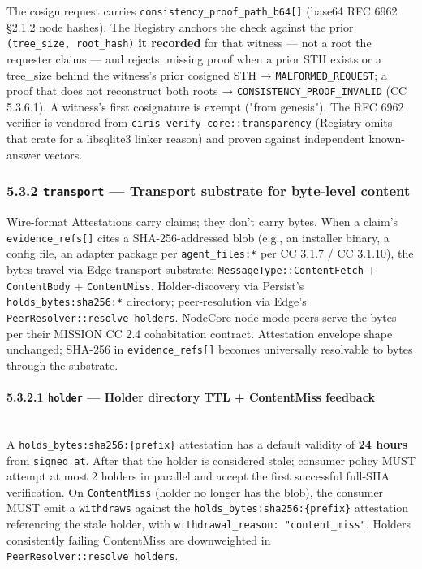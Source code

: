 \documentclass[11pt]{article}
\begin{document}
The cosign request carries \texttt{consistency\_proof\_path\_b64[]} (base64 RFC 6962 §2.1.2 node hashes). The Registry anchors the check against the prior \texttt{(tree\_size, root\_hash)} \textbf{it recorded} for that witness — not a root the requester claims — and rejects: missing proof when a prior STH exists or a tree\_size behind the witness's prior cosigned STH → \texttt{MALFORMED\_REQUEST}; a proof that does not reconstruct both roots → \texttt{CONSISTENCY\_PROOF\_INVALID} (CC 5.3.6.1). A witness's first cosignature is exempt ("from genesis"). The RFC 6962 verifier is vendored from \texttt{ciris-verify-core::transparency} (Registry omits that crate for a libsqlite3 linker reason) and proven against independent known-answer vectors.


\subsubsection*{5.3.2 \texttt{transport} — Transport substrate for byte-level content}


Wire-format Attestations carry claims; they don't carry bytes. When a claim's \texttt{evidence\_refs[]} cites a SHA-256-addressed blob (e.g., an installer binary, a config file, an adapter package per \texttt{agent\_files:*} per CC 3.1.7 / CC 3.1.10), the bytes travel via Edge transport substrate: \texttt{MessageType::ContentFetch} + \texttt{ContentBody} + \texttt{ContentMiss}. Holder-discovery via Persist's \texttt{holds\_bytes:sha256:*} directory; peer-resolution via Edge's \texttt{PeerResolver::resolve\_holders}. NodeCore node-mode peers serve the bytes per their MISSION CC 2.4 cohabitation contract. Attestation envelope shape unchanged; SHA-256 in \texttt{evidence\_refs[]} becomes universally resolvable to bytes through the substrate.


\paragraph{5.3.2.1 \texttt{holder} — Holder directory TTL + ContentMiss feedback}\mbox{}\\


A \texttt{holds\_bytes:sha256:\{prefix\}} attestation has a default validity of \textbf{24 hours} from \texttt{signed\_at}. After that the holder is considered stale; consumer policy MUST attempt at most 2 holders in parallel and accept the first successful full-SHA verification. On \texttt{ContentMiss} (holder no longer has the blob), the consumer MUST emit a \texttt{withdraws} against the \texttt{holds\_bytes:sha256:\{prefix\}} attestation referencing the stale holder, with \texttt{withdrawal\_reason: "content\_miss"}. Holders consistently failing ContentMiss are downweighted in \texttt{PeerResolver::resolve\_holders}.
\end{document}
